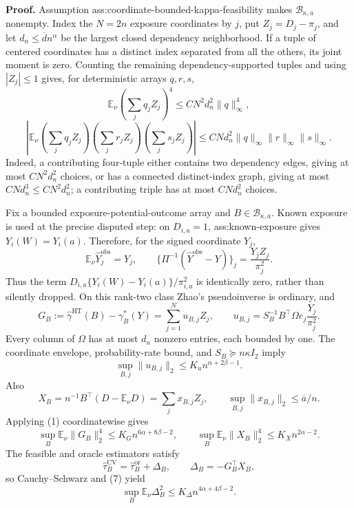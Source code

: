 \textbf{Proof.}
Assumption ass:coordinate-bounded-kappa-feasibility makes \(\mathcal B_{\kappa,\overline a}\) nonempty.  Index the \(N=2n\) exposure coordinates by \(j\), put \(Z_j=D_j-\pi_j\), and let \(d_n\le\overline d n^\alpha\) be the largest closed dependency neighborhood.  If a tuple of centered coordinates has a distinct index separated from all the others, its joint moment is zero.  Counting the remaining dependency-supported tuples and using \(|Z_j|\le1\) gives, for deterministic arrays \(q,r,s\),
\[
\mathbb E_\nu\left(\sum_jq_jZ_j\right)^4
\le C N^2d_n^2\lVert q\rVert_\infty^4,
\tag{1}
\]
\[
\left|\mathbb E_\nu
\left(\sum_jq_jZ_j\right)
\left(\sum_jr_jZ_j\right)
\left(\sum_js_jZ_j\right)\right|
\le C Nd_n^2\lVert q\rVert_\infty\lVert r\rVert_\infty\lVert s\rVert_\infty.
\tag{2}
\]
Indeed, a contributing four-tuple either contains two dependency edges, giving at most \(CN^2d_n^2\) choices, or has a connected distinct-index graph, giving at most \(CN d_n^3\le CN^2d_n^2\); a contributing triple has at most \(CN d_n^2\) choices.

Fix a bounded exposure-potential-outcome array and \(B\in\mathcal B_{\kappa,\overline a}\).  Known exposure is used at the precise disputed step: on \(D_{i,a}=1\), ass:known-exposure gives \(Y_i(W)=Y_i(a)\).  Therefore, for the signed coordinate \(Y_j\),
\[
\mathbb E_\nu\widehat Y_j^{\mathrm{obs}}=Y_j,
\qquad
\{\Pi^{-1}(\widehat Y^{\mathrm{obs}}-Y)\}_j
=\frac{Y_jZ_j}{\pi_j^2}.
\tag{3}
\]
Thus the term \(D_{i,a}\{Y_i(W)-Y_i(a)\}/\pi_{i,a}^2\) is identically zero, rather than silently dropped.  On this rank-two class Zhao's pseudoinverse is ordinary, and
\[
G_B:=\widehat\gamma^{\mathrm{HT}}(B)-\gamma_B^*(Y)
=\sum_{j=1}^{N}u_{B,j}Z_j,
\qquad
u_{B,j}=S_B^{-1}B^\top\Omega e_j\frac{Y_j}{\pi_j^2}.
\tag{4}
\]
Every column of \(\Omega\) has at most \(d_n\) nonzero entries, each bounded by one.  The coordinate envelope, probability-rate bound, and \(S_B\succeq n\kappa I_2\) imply
\[
\sup_{B,j}\lVert u_{B,j}\rVert_2
\le K_u n^{\alpha+2\beta-1}.
\tag{5}
\]
Also
\[
X_B=n^{-1}B^\top(D-\mathbb E_\nu D)
=\sum_jx_{B,j}Z_j,
\qquad
\sup_{B,j}\lVert x_{B,j}\rVert_2\le\overline a/n.
\tag{6}
\]
Applying (1) coordinatewise gives
\[
\sup_B\mathbb E_\nu\lVert G_B\rVert_2^4
\le K_Gn^{6\alpha+8\beta-2},
\qquad
\sup_B\mathbb E_\nu\lVert X_B\rVert_2^4
\le K_Xn^{2\alpha-2}.
\tag{7}
\]
The feasible and oracle estimators satisfy
\[
\widehat\tau_B^{\mathrm{CV}}=\widehat\tau_B^{\mathrm{or}}+\Delta_B,
\qquad \Delta_B=-G_B^\top X_B,
\]
so Cauchy--Schwarz and (7) yield
\[
\sup_B\mathbb E_\nu\Delta_B^2
\le K_\Delta n^{4\alpha+4\beta-2}.
\tag{8}
\]

